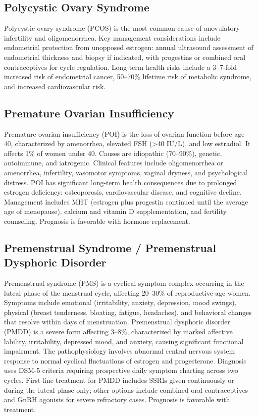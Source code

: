 \subsection{Polycystic Ovary Syndrome}
\label{sec:obstetric:Polycystic Ovary Syndrome}
Polycystic ovary syndrome (PCOS) is the most common cause of anovulatory infertility and oligomenorrhea. Key management considerations include endometrial protection from unopposed estrogen: annual ultrasound assessment of endometrial thickness and biopsy if indicated, with progestins or combined oral contraceptives for cycle regulation. Long-term health risks include a 3--7-fold increased risk of endometrial cancer, 50--70\% lifetime risk of metabolic syndrome, and increased cardiovascular risk.

\subsection{Premature Ovarian Insufficiency}
\label{sec:Premature Ovarian Insufficiency}
Premature ovarian insufficiency (POI) is the loss of ovarian function before age 40, characterized by amenorrhea, elevated FSH (>40 IU/L), and low estradiol. It affects 1\% of women under 40. Causes are idiopathic (70--90\%), genetic, autoimmune, and iatrogenic. Clinical features include oligomenorrhea or amenorrhea, infertility, vasomotor symptoms, vaginal dryness, and psychological distress. POI has significant long-term health consequences due to prolonged estrogen deficiency: osteoporosis, cardiovascular disease, and cognitive decline. Management includes MHT (estrogen plus progestin continued until the average age of menopause), calcium and vitamin D supplementation, and fertility counseling. Prognosis is favorable with hormone replacement.

\subsection{Premenstrual Syndrome / Premenstrual Dysphoric Disorder}
\label{sec:PMS PMDD}
Premenstrual syndrome (PMS) is a cyclical symptom complex occurring in the luteal phase of the menstrual cycle, affecting 20--30\% of reproductive-age women. Symptoms include emotional (irritability, anxiety, depression, mood swings), physical (breast tenderness, bloating, fatigue, headaches), and behavioral changes that resolve within days of menstruation. Premenstrual dysphoric disorder (PMDD) is a severe form affecting 3--8\%, characterized by marked affective lability, irritability, depressed mood, and anxiety, causing significant functional impairment. The pathophysiology involves abnormal central nervous system response to normal cyclical fluctuations of estrogen and progesterone. Diagnosis uses DSM-5 criteria requiring prospective daily symptom charting across two cycles. First-line treatment for PMDD includes SSRIs given continuously or during the luteal phase only; other options include combined oral contraceptives and GnRH agonists for severe refractory cases. Prognosis is favorable with treatment.

